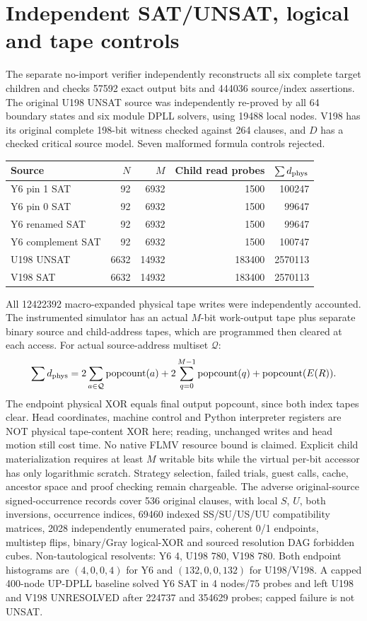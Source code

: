 \documentclass[11pt]{article}
\begin{document}
\section{Independent SAT/UNSAT, logical and tape controls}
The separate no-import verifier independently reconstructs all six complete target children and checks 57592 exact output bits and 444036 source/index assertions. The original U198 UNSAT source was independently re-proved by all 64 boundary states and six module DPLL solvers, using 19488 local nodes. V198 has its original complete 198-bit witness checked against 264 clauses, and $D$ has a checked critical source model. Seven malformed formula controls rejected.
\begin{center}\begin{tabular}{lrrrr}
\toprule Source&$N$&$M$&Child read probes&$\sum d_{\rm phys}$\\
\midrule
Y6 pin 1 SAT&92&6932&1500&100247\\
Y6 pin 0 SAT&92&6932&1500&99647\\
Y6 renamed SAT&92&6932&1500&99647\\
Y6 complement SAT&92&6932&1500&100747\\
U198 UNSAT&6632&14932&183400&2570113\\
V198 SAT&6632&14932&183400&2570113\\
\bottomrule\end{tabular}\end{center}
All 12422392 macro-expanded physical tape writes were independently accounted. The instrumented simulator has an actual $M$-bit work-output tape plus separate binary source and child-address tapes, which are programmed then cleared at each access. For actual source-address multiset $\mathcal Q$:
\[
 \sum d_{\rm phys}=
 2\sum_{a\in\mathcal Q}\mathrm{popcount}(a)+
 2\sum_{q=0}^{M-1}\mathrm{popcount}(q)+
 \mathrm{popcount}(E(R)).
\]
The endpoint physical XOR equals final output popcount, since both index tapes clear. Head coordinates, machine control and Python interpreter registers are NOT physical tape-content XOR here; reading, unchanged writes and head motion still cost time. No native FLMV resource bound is claimed. Explicit child materialization requires at least $M$ writable bits while the virtual per-bit accessor has only logarithmic scratch. Strategy selection, failed trials, guest calls, cache, ancestor space and proof checking remain chargeable.
The adverse original-source signed-occurrence records cover 536 original clauses, with local $S$, $U$, both inversions, occurrence indices, 69460 indexed SS/SU/US/UU compatibility matrices, 2028 independently enumerated pairs, coherent 0/1 endpoints, multistep flips, binary/Gray logical-XOR and sourced resolution DAG forbidden cubes. Non-tautological resolvents: Y6 4, U198 780, V198 780. Both endpoint histograms are $(4,0,0,4)$ for Y6 and $(132,0,0,132)$ for U198/V198. A capped 400-node UP-DPLL baseline solved Y6 SAT in 4 nodes/75 probes and left U198 and V198 UNRESOLVED after 224737 and 354629 probes; capped failure is not UNSAT.
\end{document}
